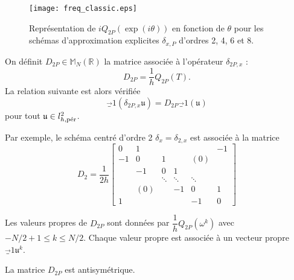 \begin{figure}[htbp]
\begin{center}
\texttt{[image: freq\_classic.eps]}
\end{center}
\caption{Représentation de $i Q_{2P}\left( \exp(i \theta) \right)$ en fonction de $\theta$ pour les schémas d'approximation explicites $\delta_{x,P}$ d'ordres 2, 4, 6 et 8.}
\label{fig:freq_classic}
\end{figure}

On définit $D_{2P} \in \mathbb{M}_N(\mathbb{R})$ la matrice associée à l'opérateur $\delta_{2P,x}$ :
\begin{equation}
D_{2P} = \dfrac{1}{h} Q_{2P}(T).
\end{equation}
La relation suivante est alors vérifiée
\begin{equation}
\vec_1(\delta_{2P,x} \mathfrak{u}) = D_{2P} \vec_1 ( \mathfrak{u} )
\end{equation}
pour tout $\mathfrak{u} \in l^2_{h,\per}$.

Par exemple, le schéma centré d'ordre 2 $\delta_x = \delta_{2,x}$ est associée à la matrice
\begin{equation}
D_2 = \dfrac{1}{2h}
\begin{bmatrix}
0 & 1 &   &   &   & -1 \\ 
-1 & 0 & 1 &   & (0) &   \\ 
  & -1 & 0 & 1 &   &   \\ 
  &   & \ddots & \ddots & \ddots &   \\ 
  & (0) &   & -1 & 0 & 1 \\ 
1 &   &   &   & -1 & 0
\end{bmatrix} 
\end{equation}

\begin{proposition}
Les valeurs propres de $D_{2P}$ sont données par $\dfrac{1}{h}Q_{2P}(\omega^k)$ avec $-N/2 +1 \leq k \leq N/2$. Chaque valeur propre est associée à un vecteur propre $\vec_1{\mathfrak{u}^k}$.
\end{proposition}

\begin{proposition}
La matrice $D_{2P}$ est antisymétrique.
\end{proposition}

